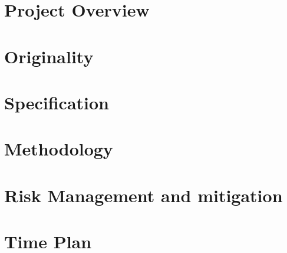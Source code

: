 \documentclass{article}
\begin{document}

\pagebreak



\section{Project Overview}  %

\section{Originality}   %

\section{Specification} %

\section{Methodology}   %

\section{Risk Management and mitigation} %

\section{Time Plan} %




\pagebreak
\end{document}
